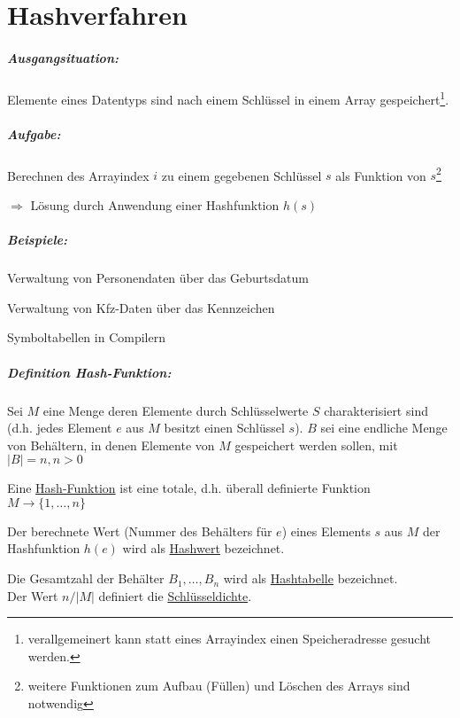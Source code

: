 \chapter{Hashverfahren}
\paragraph{Ausgangsituation:} Elemente eines Datentyps sind nach einem Schlüssel in einem Array gespeichert\footnote{verallgemeinert kann statt eines Arrayindex einen Speicheradresse gesucht werden.}.
\paragraph{Aufgabe:} Berechnen des Arrayindex $i$ zu einem gegebenen Schlüssel $s$ als Funktion von $s$\footnote{weitere Funktionen zum Aufbau ({\flqq Füllen\frqq}) und Löschen des Arrays sind notwendig}

$\Rightarrow$ Lösung durch Anwendung einer Hashfunktion $h(s)$

\paragraph{Beispiele:}
\begin{compactitem}
	\item Verwaltung von Personendaten über das Geburtsdatum
	\item Verwaltung von Kfz-Daten über das Kennzeichen
	\item Symboltabellen in Compilern
\end{compactitem}

\paragraph{Definition Hash-Funktion:} Sei $M$ eine Menge deren Elemente durch Schlüsselwerte $S$ charakterisiert sind (d.h. jedes Element $e$ aus $M$ besitzt einen Schlüssel $s$). $B$ sei eine endliche Menge von Behältern, in denen Elemente von $M$ gespeichert werden sollen, mit $|B| = n, n>0$

Eine \ul{Hash-Funktion} ist eine totale, d.h. überall definierte Funktion $M \to \{1, \ldots, n\}$

Der berechnete Wert (Nummer des Behälters für $e$) eines Elements $s$ aus $M$ der Hashfunktion $h(e)$ wird als \ul{Hashwert} bezeichnet.

Die Gesamtzahl der Behälter $B_1, \ldots, B_n$ wird als \ul{Hashtabelle} bezeichnet.\\
Der Wert $n/|M|$ definiert die \ul{Schlüsseldichte}.

